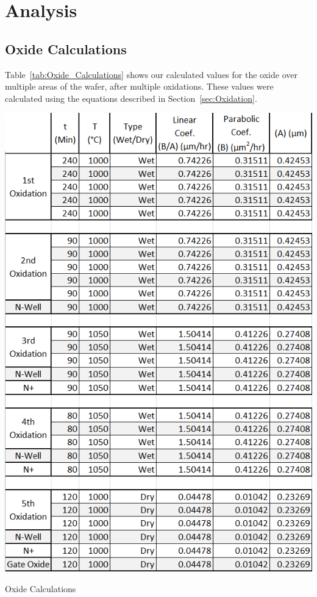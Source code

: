 \documentclass[letter,12pt]{article}
\begin{document}
\section{Analysis}
	\subsection{Oxide Calculations}
		\FloatBarrier
		Table~\ref{tab:Oxide_Calculations} shows our calculated values for the oxide over multiple areas of the wafer, after multiple oxidations.  These values were calculated using the equations described in Section~\ref{sec:Oxidation}. 
		
		\begin{table}[]
		  \centering
		  \includegraphics[scale=.75]{./Images/Oxide_Thickness_Calculations.png}
		  \caption{Oxide Calculations}
		  \label{tab:Oxide_Calculations}
		\end{table}
	
\end{document}
